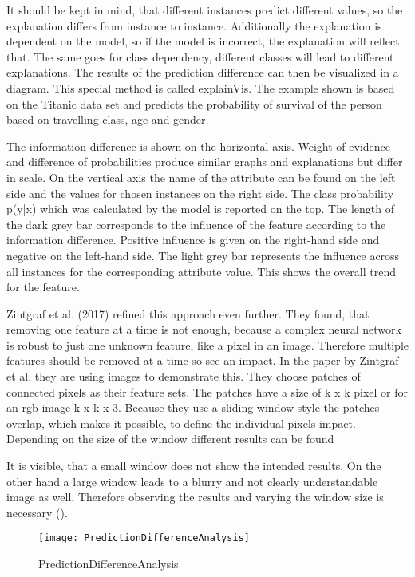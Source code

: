 It should be kept in mind, that different instances predict different values, so the explanation differs from instance to instance. Additionally the explanation is dependent on the model, so if the model is incorrect, the explanation will reflect that. The same goes for class dependency, different classes will lead to different explanations.
The results of the prediction difference can then be visualized in a diagram. This special method is called explainVis. The example shown is based on the Titanic data set and predicts the probability of survival of the person based on travelling class, age and gender.
\par
The information difference is shown on the horizontal axis. Weight of evidence and difference of probabilities produce similar graphs and explanations but differ in scale. On the vertical axis the name of the attribute can be found on the left side and the values for chosen instances on the right side. The class probability p(y|x) which was calculated by the model is reported on the top.
The length of the dark grey bar corresponds to the influence of the feature according to the information difference. Positive influence is given on the right-hand side and negative on the left-hand side. The light grey bar represents the influence across all instances for the corresponding attribute value. This shows the overall trend for the feature.
\par
Zintgraf et al. (2017) refined this approach even further. They found, that removing one feature at a time is not enough, because a complex neural network is robust to just one unknown feature, like a pixel in an image. Therefore multiple features should be removed at a time so see an impact. In the paper by Zintgraf et al. they are using images to demonstrate this. They choose patches of connected pixels as their feature sets. The patches have a size of k x k pixel or for an rgb image k x k x 3. Because they use a sliding window style the patches overlap, which makes it possible, to define the individual pixels impact. Depending on the size of the window different results can be found 
\par
It is visible, that a small window does not show the intended results. On the other hand a large window leads to a blurry and not clearly understandable image as well. Therefore observing the results and varying the window size is necessary (). 
\begin{figure*}
    \center
    \texttt{[image: PredictionDifferenceAnalysis]}
    \caption{PredictionDifferenceAnalysis}
\end{figure*}

